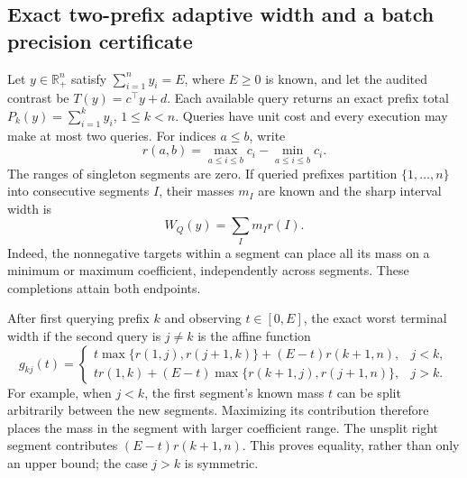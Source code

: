 \subsection{Exact two-prefix adaptive width and a batch precision certificate}
Let $y\in\mathbb R_+^n$ satisfy $\sum_{i=1}^n y_i=E$, where $E\geq0$ is
known, and let the audited contrast be $T(y)=c^\top y+d$.  Each available query
returns an exact prefix total $P_k(y)=\sum_{i=1}^k y_i$, $1\leq k<n$.
Queries have unit cost and every execution may make at most two queries.
For indices $a\leq b$, write
\[
 r(a,b)=\max_{a\leq i\leq b}c_i-\min_{a\leq i\leq b}c_i.
\]
The ranges of singleton segments are zero.  If queried prefixes partition
$\{1,\ldots,n\}$ into consecutive segments $I$, their masses $m_I$ are known
and the sharp interval width is
\begin{equation}\label{eq:counter_segment_width}
 W_Q(y)=\sum_I m_I r(I).
\end{equation}
Indeed, the nonnegative targets within a segment can place all its mass on a
minimum or maximum coefficient, independently across segments.  These
completions attain both endpoints.

After first querying prefix $k$ and observing $t\in[0,E]$, the exact worst
terminal width if the second query is $j\ne k$ is the affine function
\begin{equation}\label{eq:counter_conditional_line}
 g_{kj}(t)=
 \begin{cases}
 t\max\{r(1,j),r(j+1,k)\}+(E-t)r(k+1,n),&j<k,\\
 tr(1,k)+(E-t)\max\{r(k+1,j),r(j+1,n)\},&j>k.
 \end{cases}
\end{equation}
For example, when $j<k$, the first segment's known mass $t$ can be split
arbitrarily between the new segments.  Maximizing its contribution therefore
places the mass in the segment with larger coefficient range.  The unsplit
right segment contributes $(E-t)r(k+1,n)$.  This proves equality, rather than
only an upper bound; the case $j>k$ is symmetric.

